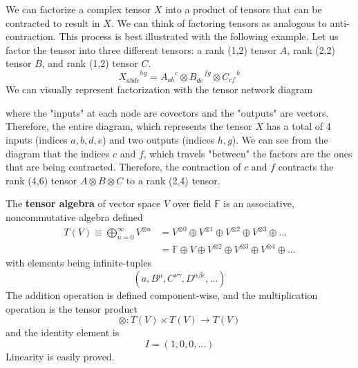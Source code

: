   \begin{definition}
  We can factorize a complex tensor $X$ into a product of tensors that can be contracted to result in $X$. We can think of factoring tensors as analogous to anti-contraction. This process is best illustrated with the following example. Let us factor the tensor into three different tensors: a rank (1,2) tensor $A$, rank (2,2) tensor $B$, and rank (1,2) tensor $C$. 
  \[X_{abde}^{\;\;\;\;\;\;\;hg} = A_{ab}^{\;\;\;\;c} \otimes B_{de}^{\;\;\;\;fg} \otimes C_{cf}^{\;\;\;\;h}\]
  We can visually represent factorization with the tensor network diagram
  \begin{center}
  \end{center}
  where the "inputs" at each node are covectors and the "outputs" are vectors. Therefore, the entire diagram, which represents the tensor $X$ has a total of 4 inputs (indices $a, b, d, e$) and two outputs (indices $h, g$). We can see from the diagram that the indices $c$ and $f$, which travels "between" the factors are the ones that are being contracted. Therefore, the contraction of $c$ and $f$ contracts the rank (4,6) tensor $A \otimes B \otimes C$ to a rank (2,4) tensor. 
  \end{definition}

  \begin{definition}
  The \textbf{tensor algebra} of vector space $V$ over field $\mathbb{F}$ is an associative, noncommutative algebra defined
  \begin{align*}
      T(V) \equiv \bigoplus_{n = 0}^{\infty} V^{\otimes n} & = V^{\otimes 0} \oplus V^{\otimes 1} \oplus V^{\otimes 2} \oplus V^{\otimes 3} \oplus ... \\
      & = \mathbb{F} \oplus V \oplus V^{\otimes 2} \oplus V^{\otimes 3} \oplus V^{\otimes 4} \oplus ...
  \end{align*}
  with elements being infinite-tuples
  \[ (a, B^\mu, C^{\nu \gamma}, D^{\alpha \beta \epsilon}, ...)\]
  The addition operation is defined component-wise, and the multiplication operation is the tensor product 
  \[\otimes: T(V) \times T(V) \longrightarrow T(V)\]
  and the identity element is
  \[I = (1, 0, 0, ...) \]
  Linearity is easily proved. 
  \end{definition}

